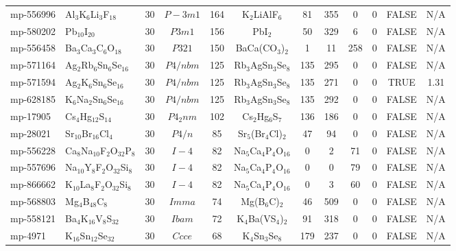 {\begin{longtable}{llcccccccccc}
    mp-556996 & Al$_{3}$K$_{6}$Li$_{3}$F$_{18}$ & 30    & $P-3m1$ & 164   & K$_{2}$LiAlF$_{6}$ & 81    & 355   & 0     & 0     & FALSE & N/A \\
    mp-580202 & Pb$_{10}$I$_{20}$ & 30    & $P3m1$ & 156   & PbI$_{2}$ & 50    & 329   & 6     & 0     & FALSE & N/A \\
    mp-556458 & Ba$_{3}$Ca$_{3}$C$_{6}$O$_{18}$ & 30    & $P321$ & 150   & BaCa(CO$_{3}$)$_{2}$ & 1     & 11    & 258   & 0     & FALSE & N/A \\
    mp-571164 & Ag$_{2}$Rb$_{6}$Sn$_{6}$Se$_{16}$ & 30    & $P4/nbm$ & 125   & Rb$_{3}$AgSn$_{3}$Se$_{8}$ & 135   & 295   & 0     & 0     & FALSE & N/A \\
    mp-571594 & Ag$_{2}$K$_{6}$Sn$_{6}$Se$_{16}$ & 30    & $P4/nbm$ & 125   & Rb$_{3}$AgSn$_{3}$Se$_{8}$ & 135   & 271   & 0     & 0     & TRUE  & 1.31  \\
    mp-628185 & K$_{6}$Na$_{2}$Sn$_{6}$Se$_{16}$ & 30    & $P4/nbm$ & 125   & Rb$_{3}$AgSn$_{3}$Se$_{8}$ & 135   & 292   & 0     & 0     & FALSE & N/A \\
    mp-17905 & Cs$_{4}$Hg$_{12}$S$_{14}$ & 30    & $P4_2nm$ & 102   & Cs$_{2}$Hg$_{6}$S$_{7}$ & 136   & 186   & 0     & 0     & FALSE & N/A \\
    mp-28021 & Sr$_{10}$Br$_{16}$Cl$_{4}$ & 30    & $P4/n$ & 85    & Sr$_{5}$(Br$_{4}$Cl)$_{2}$ & 47    & 94    & 0     & 0     & FALSE & N/A \\
    mp-556228 & Ca$_{8}$Na$_{10}$F$_{2}$O$_{32}$P$_{8}$ & 30    & $I-4$ & 82    & Na$_{5}$Ca$_{4}$P$_{4}$O$_{16}$ & 0     & 2     & 71    & 0     & FALSE & N/A \\
    mp-557696 & Na$_{10}$Y$_{8}$F$_{2}$O$_{32}$Si$_{8}$ & 30    & $I-4$ & 82    & Na$_{5}$Ca$_{4}$P$_{4}$O$_{16}$ & 0     & 0     & 79    & 0     & FALSE & N/A \\
    mp-866662 & K$_{10}$La$_{8}$F$_{2}$O$_{32}$Si$_{8}$ & 30    & $I-4$ & 82    & Na$_{5}$Ca$_{4}$P$_{4}$O$_{16}$ & 0     & 3     & 60    & 0     & FALSE & N/A \\
    mp-568803 & Mg$_{4}$B$_{48}$C$_{8}$ & 30    & $Imma$ & 74    & Mg(B$_{6}$C)$_{2}$ & 46    & 509   & 0     & 0     & FALSE & N/A \\
    mp-558121 & Ba$_{4}$K$_{16}$V$_{8}$S$_{32}$ & 30    & $Ibam$ & 72    & K$_{4}$Ba(VS$_{4}$)$_{2}$ & 91    & 318   & 0     & 0     & FALSE & N/A \\
    mp-4971 & K$_{16}$Sn$_{12}$Se$_{32}$ & 30    & $Ccce$ & 68    & K$_{4}$Sn$_{3}$Se$_{8}$ & 179   & 237   & 0     & 0     & FALSE & N/A \\

\end{longtable}}
